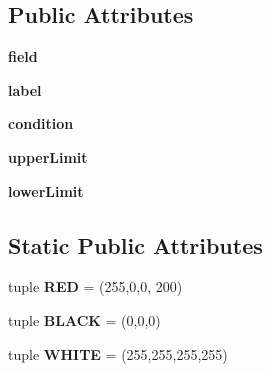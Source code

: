 \subsection*{Public Attributes}
\begin{DoxyCompactItemize}
\item 
\hypertarget{classmain_1_1_input_field_ac7c8017f76341a8d8f6a1a09c226add9}{{\bfseries field}}\label{classmain_1_1_input_field_ac7c8017f76341a8d8f6a1a09c226add9}

\item 
\hypertarget{classmain_1_1_input_field_a2f0d457edde44c09256150e31ec2bfc1}{{\bfseries label}}\label{classmain_1_1_input_field_a2f0d457edde44c09256150e31ec2bfc1}

\item 
\hypertarget{classmain_1_1_input_field_a5296296f421694db0f289ffd121e9d84}{{\bfseries condition}}\label{classmain_1_1_input_field_a5296296f421694db0f289ffd121e9d84}

\item 
\hypertarget{classmain_1_1_input_field_a175706f63238e8263b30c9fa0ccdb7bf}{{\bfseries upper\-Limit}}\label{classmain_1_1_input_field_a175706f63238e8263b30c9fa0ccdb7bf}

\item 
\hypertarget{classmain_1_1_input_field_abb0ed7a628f5dc6a6c78971bfc26ffef}{{\bfseries lower\-Limit}}\label{classmain_1_1_input_field_abb0ed7a628f5dc6a6c78971bfc26ffef}

\end{DoxyCompactItemize}
\subsection*{Static Public Attributes}
\begin{DoxyCompactItemize}
\item 
\hypertarget{classmain_1_1_input_field_a86c93f757f805f7db73ac1f4111dc599}{tuple {\bfseries R\-E\-D} = (255,0,0, 200)}\label{classmain_1_1_input_field_a86c93f757f805f7db73ac1f4111dc599}

\item 
\hypertarget{classmain_1_1_input_field_a5a7aab7a4f6727fd9250d981ba4d3c5a}{tuple {\bfseries B\-L\-A\-C\-K} = (0,0,0)}\label{classmain_1_1_input_field_a5a7aab7a4f6727fd9250d981ba4d3c5a}

\item 
\hypertarget{classmain_1_1_input_field_a7d0206bd289b7a6e75a4f4b33b79e537}{tuple {\bfseries W\-H\-I\-T\-E} = (255,255,255,255)}\label{classmain_1_1_input_field_a7d0206bd289b7a6e75a4f4b33b79e537}

\end{DoxyCompactItemize}


